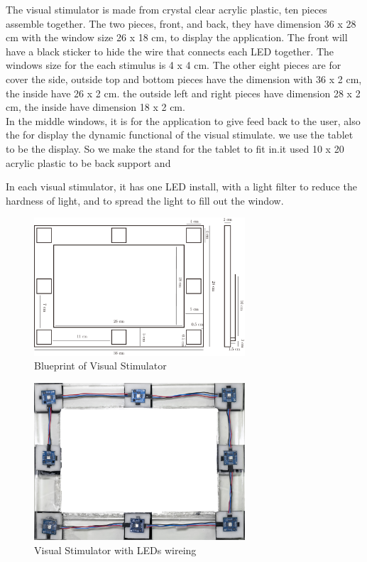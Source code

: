 The visual stimulator is made from crystal clear acrylic plastic, ten pieces assemble together. The two pieces, front, and back, they have dimension 36 x 28 cm with the window size 26 x 18 cm, to display the application. The front will have a black sticker to hide the wire that connects each LED together. The windows size for the each stimulus is 4 x 4 cm. The other eight pieces are for cover the side, outside top and bottom pieces have the dimension with 36 x 2 cm, the inside have 26 x 2 cm. the outside left and right pieces have dimension 28 x 2 cm, the inside have dimension 18 x 2  cm.\\

In the middle windows, it is for the application to give feed back to the user, also the for display the dynamic functional of the visual stimulate. we use the tablet to be the display. So we make the stand for the tablet to fit in.it used 10 x 20 acrylic plastic to be back support and 

In each visual stimulator, it has one LED install, with a light filter to reduce the hardness of light, and to spread the light to fill out the window.

\begin{figure}[ht]
	\centering
	\includegraphics[width=0.7\textwidth]{chapter6/blueprint.pdf}
	\caption{Blueprint of Visual Stimulator}
\end{figure}

\begin{figure}[ht]
	\centering
	\includegraphics[width=0.7\textwidth]{chapter6/frame_LED.jpg}
	\caption{Visual Stimulator with LEDs wireing}
\end{figure}

